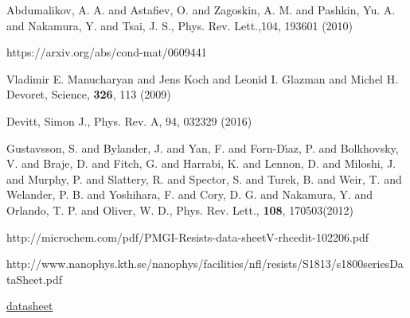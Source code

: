 \begin{thebibliography}{99}
 {Abdumalikov,  A.  A.  and Astafiev,  O.  and Zagoskin, A.   M.  and
    Pashkin, Yu.  A.  and  Nakamura, Y.  and Tsai, J.  S.},  {Phys.  Rev. Lett.},104, {193601}
  (2010)

 https://arxiv.org/abs/cond-mat/0609441

 {Vladimir  E. Manucharyan and Jens  Koch and Leonid I.   Glazman and
    Michel H. Devoret}, {Science}, \textbf{326}, 113 (2009)

 Devitt, Simon J., Phys. Rev. A, {94}, {032329} (2016)

 {Gustavsson, S.   and Bylander, J.  and Yan,  F.  and Forn-D\'{\i}az,
    P.  and Bolkhovsky, V.  and Braje, D.  and  Fitch, G.  and Harrabi, K. and Lennon, D.  and
    Miloshi, J. and Murphy, P.  and Slattery, R.   and Spector, S. and Turek, B.  and Weir, T.
    and Welander,  P. B.  and Yoshihara,  F. and Cory, D.   G. and Nakamura, Y.   and Orlando,
    T. P.  and Oliver, W. D.}, {Phys. Rev. Lett.}, \textbf{108}, 170503(2012)



 http://microchem.com/pdf/PMGI-Resists-data-sheetV-rhcedit-102206.pdf
  
  http://www.nanophys.kth.se/nanophys/facilities/nfl/resists/S1813/s1800seriesDataSheet.pdf

  \href{http://microchem.com/products/images/uploads/MF_319_Data_Sheet.pdf}{datasheet}
\end{thebibliography}

